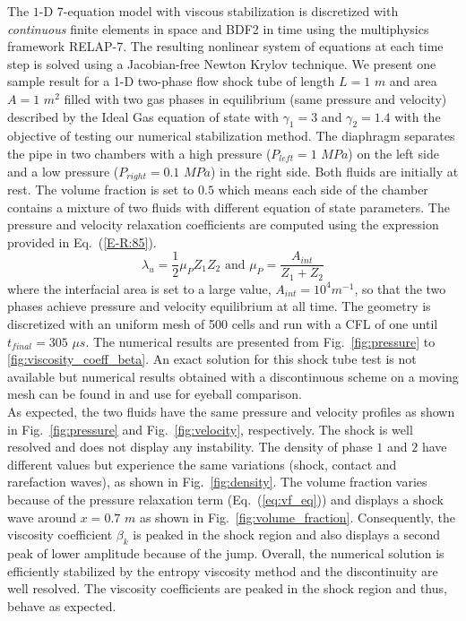 \documentclass{anstrans}
\newcommand{\eqt}[1]{Eq.~(\ref{#1})}                     %
\newcommand{\fig}[1]{Fig.~\ref{#1}}                      %
\begin{document}
The $1$-D 7-equation model with viscous stabilization is discretized with {\it continuous} finite elements in space and BDF2 in time using the multiphysics framework RELAP-7. The resulting nonlinear system of equations at each time step is solved using a Jacobian-free Newton Krylov technique. We present one sample result for a 1-D two-phase flow shock tube of length $L=1$ $m$ and area $A=1$ $m^2$ filled with two gas phases in equilibrium (same pressure and velocity) described by the Ideal Gas equation of state with $\gamma_1 = 3$ and $\gamma_2 = 1.4$ with the objective of testing our numerical stabilization method. The diaphragm separates the pipe in two chambers with a high pressure ($P_{left} = 1$ $MPa$) on the left side and a low pressure ($P_{right} = 0.1$ $MPa$) in the right side. Both fluids are initially at rest. The volume fraction is set to $0.5$ which means each side of the chamber contains a mixture of two fluids with different equation of state parameters. The pressure and velocity relaxation coefficients are computed using the expression provided in \eqt{E-R:85}. 
%
\begin{equation}\label{E-R:85}
  \lambda_u = \frac{1}{2} \mu_P Z_{1} Z_{2} \text{ and }
  \mu_P = \frac{A_{int}}{Z_{1}+Z_{2}} 
\end{equation}
%
where the interfacial area is set to a large value, $A_{int} = 10^4 m^{-1}$, so that the two phases achieve pressure and velocity equilibrium at all time. The geometry is discretized with an uniform mesh of 500 cells and run with a CFL of one until $t_{final} = 305$ $\mu s$. The numerical results are presented from \fig{fig:pressure} to \ref{fig:viscosity_coeff_beta}. An exact solution for this shock tube test is not available but numerical results obtained with a discontinuous scheme on a moving mesh can be found in \cite{Saurel_2007} and use for eyeball comparison.\\

As expected, the two fluids have the same pressure and velocity profiles as shown in \fig{fig:pressure} and \fig{fig:velocity}, respectively. The shock is well resolved and does not display any instability. The density of phase $1$ and $2$ have different values but experience the same variations (shock, contact and rarefaction waves), as shown in \fig{fig:density}. The volume fraction varies because of the pressure relaxation term (\eqt{eq:vf_eq}) and displays a shock wave around $x=0.7$ $m$ as shown in \fig{fig:volume_fraction}. Consequently, the viscosity coefficient $\beta_k$ is peaked in the shock region and also displays a second peak of lower amplitude because of the jump. Overall, the numerical solution is efficiently stabilized by the entropy viscosity method and the discontinuity are well resolved. The viscosity coefficients are peaked in the shock region and thus, behave as expected. 
\end{document}
